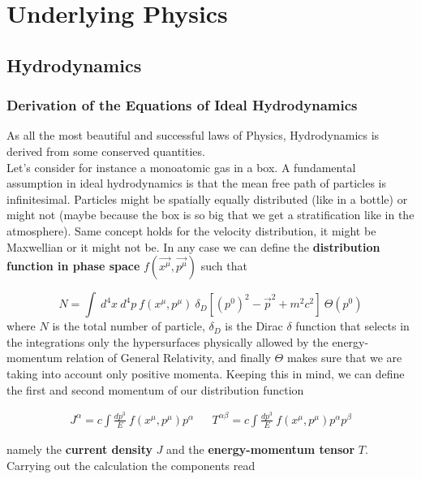 
\chapter{Underlying Physics}
\section{Hydrodynamics}
\subsection{Derivation of the Equations of Ideal Hydrodynamics}
As all the most beautiful and successful laws of Physics, Hydrodynamics is derived from some conserved quantities. \\
Let's consider for instance a monoatomic gas in a box. A fundamental assumption in ideal hydrodynamics is that the mean free path of particles is infinitesimal. Particles might be spatially equally distributed (like in a bottle) or might not (maybe because the box is so big that we get a stratification like in the atmosphere). Same concept holds for the velocity distribution, it might be Maxwellian or it might not be. 
In any case we can define the \textbf{distribution function in phase space} $f( \vec{x^{\mu}}, \vec{p^{\mu}})$ such that

$$N=\int \ d^4x \ d^4p \ f( x^{\mu}, p^{\mu}) \  \delta_D[(p^0)^2-\vec{p}^2+m^2c^2] \  \Theta(p^0)$$ 
 where $N$ is the total number of particle, $\delta_D$ is the Dirac $\delta$ function that selects in the integrations only the hypersurfaces physically allowed by the energy-momentum relation of General Relativity, and finally $\Theta$ makes sure that we are taking into account only positive momenta. 
Keeping this in mind, we can define the first and second momentum of our distribution function

\begin{align}
J^{\alpha}= c \int \frac{dp^3}{E} \ f( x^{\mu}, p^{\mu}) p^{\alpha}  &&   T^{\alpha \beta}= c \int \frac{dp^3}{E} \ f( x^{\mu}, p^{\mu}) p^{\alpha}p^{\beta}  
\end{align}
 
namely the \textbf{current density} $J$ and the \textbf{energy-momentum tensor} $T$. Carrying out the calculation the components read 


